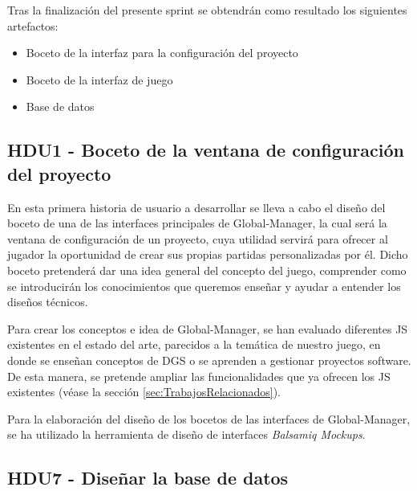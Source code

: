 Tras la finalización del presente sprint se obtendrán como resultado los siguientes artefactos:
\begin{itemize}
	\item Boceto de la interfaz para la configuración del proyecto
	\item Boceto de la interfaz de juego
	\item Base de datos
\end{itemize}

\subsection{HDU1 - Boceto de la ventana de configuración del proyecto}
\label{sec:HDU1}

En esta primera historia de usuario a desarrollar se lleva a cabo el diseño del boceto de una de las interfaces principales de Global-Manager, la cual será la ventana de configuración de un proyecto, cuya utilidad servirá para ofrecer al jugador la oportunidad de crear sus propias partidas personalizadas por él. Dicho boceto pretenderá dar una idea general del concepto del juego, comprender como se introducirán los conocimientos que queremos enseñar y ayudar a entender los diseños técnicos.

Para crear los conceptos e idea de Global-Manager, se han evaluado diferentes JS existentes en el estado del arte, parecidos a la temática de nuestro juego, en donde se enseñan conceptos de DGS o se aprenden a gestionar proyectos software. De esta manera, se pretende ampliar las funcionalidades que ya ofrecen los JS existentes (véase la sección \ref{sec:TrabajosRelacionados}).

Para la elaboración del diseño de los bocetos de las interfaces de Global-Manager, se ha utilizado la herramienta de diseño de interfaces \emph{Balsamiq Mockups}.

\label{sec:HDU2}

\subsection{HDU7 - Diseñar la base de datos}
\label{sec:HDU7}